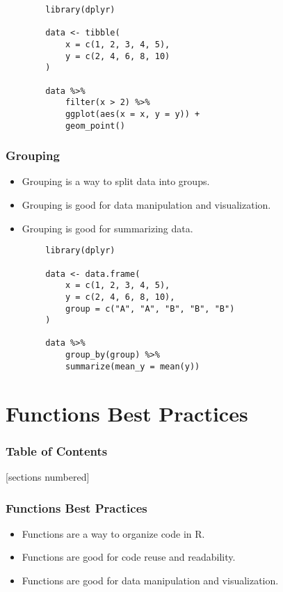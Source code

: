 \documentclass[serif, 9pt, aspectratio=32]{beamer}
\begin{document}
\begin{frame}[fragile]
    \begin{lstlisting}
        library(dplyr)

        data <- tibble(
            x = c(1, 2, 3, 4, 5),
            y = c(2, 4, 6, 8, 10)
        )

        data %>%
            filter(x > 2) %>%
            ggplot(aes(x = x, y = y)) +
            geom_point()
    \end{lstlisting}
\end{frame}

\begin{frame}
    \centering
    \frametitle{Grouping}
    \begin{itemize}
        \setlength{\itemsep}{2em}
        \item Grouping is a way to split data into groups.
        \item Grouping is good for data manipulation and visualization.
        \item Grouping is good for summarizing data.
    \end{itemize}
\end{frame}

\begin{frame}[fragile]
    \begin{lstlisting}
        library(dplyr)

        data <- data.frame(
            x = c(1, 2, 3, 4, 5),
            y = c(2, 4, 6, 8, 10),
            group = c("A", "A", "B", "B", "B")
        )

        data %>%
            group_by(group) %>%
            summarize(mean_y = mean(y))
    \end{lstlisting}
\end{frame}

\section{Functions Best Practices}

\begin{frame}
    \frametitle{Table of Contents}
    [sections numbered]
    \tableofcontents[currentsection]
\end{frame}

\begin{frame}
    \centering
    \frametitle{Functions Best Practices}
    \begin{itemize}
        \setlength{\itemsep}{2em}
        \item Functions are a way to organize code in R.
        \item Functions are good for code reuse and readability.
        \item Functions are good for data manipulation and visualization.
    \end{itemize}
\end{frame}
\end{document}
